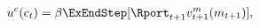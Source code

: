   \begin{equation}\begin{gathered}\begin{aligned}
        \uFunc^{{c}}({c}_{t})  & = \DiscFac \ExEndStep [{\Rport}_{t+1} \vFunc^{{m}}_{t+1}({m}_{t+1})] \label{eq:valfuncFOCRtilde},
      \end{aligned}\end{gathered}\end{equation}
